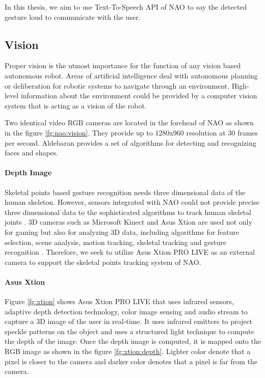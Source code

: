  

In this thesis, we aim to use Text-To-Speech API of NAO to say the detected gesture loud to communicate with the user.



\subsection{Vision} \label{sec:nao:vision} Proper vision is the utmost importance for the function of any vision based autonomous robot. Areas of artificial intelligence deal with autonomous planning or deliberation for robotic systems to navigate through an environment. High-level information about the environment could be provided by a computer vision system that is acting as a vision of the robot.

Two identical video RGB cameras are located in the forehead of NAO as shown in the figure \ref{fg:nao:vision}. They provide up to 1280x960 resolution at 30 frames per second. Aldebaran provides a set of algorithms for detecting and recognizing faces and shapes.

\paragraph*{Depth Image} Skeletal points based gesture recognition needs three dimensional data of the human skeleton. However, sensors integrated with NAO could not provide precise three dimensional data to the sophisticated algorithms to track human skeletal joints \cite{17}. 3D cameras such as Microsoft Kinect and Asus Xtion are used not only for gaming but also for analyzing 3D data, including algorithms for feature selection, scene analysis, motion tracking, skeletal tracking and gesture recognition \cite{9} \cite{18}. Therefore, we seek to utilize Asus Xtion PRO LIVE as an external camera to support the skeletal points tracking system of NAO. 



\paragraph*{Asus Xtion} Figure \ref{fg:xtion} shows Asus Xtion PRO LIVE that uses infrared sensors, adaptive depth detection technology, color image sensing and audio stream to capture a 3D image of the user in real-time. It uses infrared emitters to project speckle patterns on the object and uses a structured light technique to compute the depth of the image. Once the depth image is computed, it is mapped onto the RGB image as shown in the figure \ref{fg:xtion:depth}. Lighter color denote that a pixel is closer to the camera and darker color denotes that a pixel is far from the camera.

